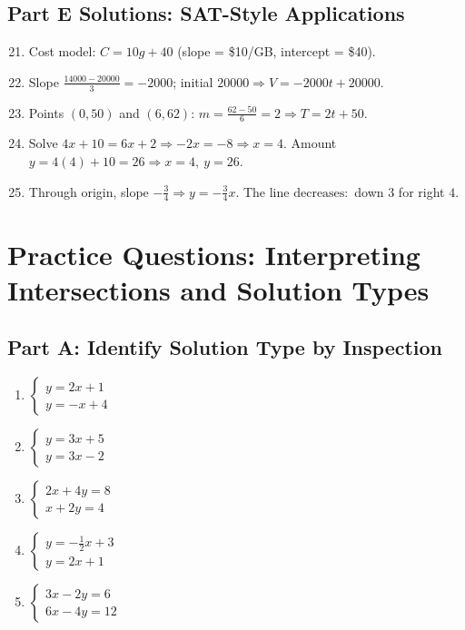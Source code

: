 \documentclass[14pt]{extarticle}
\begin{document}
\subsection*{Part E Solutions: SAT-Style Applications}
\begin{enumerate}
    \setcounter{enumi}{20}
    \item Cost model: \(\boxed{C=10g+40}\) (slope = \$10/GB, intercept = \$40).
    \item Slope \(\frac{14000-20000}{3}=-2000\); initial \(20000\Rightarrow \boxed{V=-2000t+20000}\).
    \item Points \((0,50)\) and \((6,62)\): \(m=\frac{62-50}{6}=2\Rightarrow \boxed{T=2t+50}\).
    \item Solve \(4x+10=6x+2\Rightarrow -2x=-8\Rightarrow x=4\). Amount \(y=4(4)+10=26\Rightarrow \boxed{x=4,\ y=26}\).
    \item Through origin, slope \(-\tfrac34\Rightarrow \boxed{y=-\tfrac34 x}\). The line \(\boxed{\text{decreases}}:\) down \(3\) for right \(4\).
\end{enumerate}

\newpage


\section*{Practice Questions: Interpreting Intersections and Solution Types}

\subsection*{Part A: Identify Solution Type by Inspection}
\begin{enumerate}
    \item \(\begin{cases} y = 2x + 1 \\ y = -x + 4 \end{cases}\)
    \item \(\begin{cases} y = 3x + 5 \\ y = 3x - 2 \end{cases}\)
    \item \(\begin{cases} 2x + 4y = 8 \\ x + 2y = 4 \end{cases}\)
    \item \(\begin{cases} y = -\tfrac{1}{2}x + 3 \\ y = 2x + 1 \end{cases}\)
    \item \(\begin{cases} 3x - 2y = 6 \\ 6x - 4y = 12 \end{cases}\)
\end{enumerate}
\end{document}
